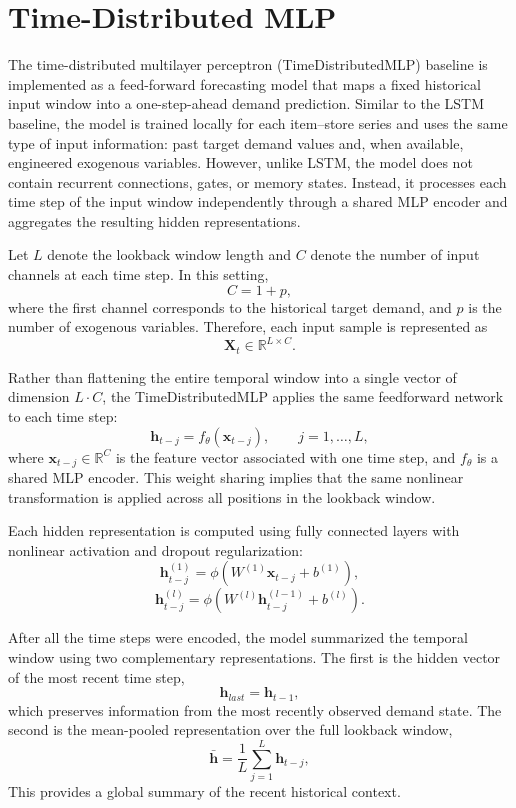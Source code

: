 \section{Time-Distributed MLP}

The time-distributed multilayer perceptron (TimeDistributedMLP) baseline is implemented as a feed-forward forecasting model that maps a fixed historical input window into a one-step-ahead demand prediction. Similar to the LSTM baseline, the model is trained locally for each item--store series and uses the same type of input information: past target demand values and, when available, engineered exogenous variables. However, unlike LSTM, the model does not contain recurrent connections, gates, or memory states. Instead, it processes each time step of the input window independently through a shared MLP encoder and aggregates the resulting hidden representations.

Let \(L\) denote the lookback window length and \(C\) denote the number of input channels at each time step. In this setting,
\[
C = 1 + p,
\]
where the first channel corresponds to the historical target demand, and \(p\) is the number of exogenous variables. Therefore, each input sample is represented as
\[
\mathbf{X}_t \in \mathbb{R}^{L \times C}.
\]

Rather than flattening the entire temporal window into a single vector of dimension \(L \cdot C\), the TimeDistributedMLP applies the same feedforward network to each time step:
\[
\mathbf{h}_{t-j} = f_{\theta}(\mathbf{x}_{t-j}), 
\qquad j = 1,\ldots,L,
\]
where \(\mathbf{x}_{t-j} \in \mathbb{R}^{C}\) is the feature vector associated with one time step, and \(f_{\theta}\) is a shared MLP encoder. This weight sharing implies that the same nonlinear transformation is applied across all positions in the lookback window.

Each hidden representation is computed using fully connected layers with nonlinear activation and dropout regularization:
\[
\mathbf{h}^{(1)}_{t-j} = \phi(W^{(1)}\mathbf{x}_{t-j} + b^{(1)}),
\]
\[
\mathbf{h}^{(l)}_{t-j} = \phi(W^{(l)}\mathbf{h}^{(l-1)}_{t-j} + b^{(l)}).
\]

After all the time steps were encoded, the model summarized the temporal window using two complementary representations. The first is the hidden vector of the most recent time step,
\[
\mathbf{h}_{last} = \mathbf{h}_{t-1},
\]
which preserves information from the most recently observed demand state. The second is the mean-pooled representation over the full lookback window,
\[
\bar{\mathbf{h}} = \frac{1}{L}\sum_{j=1}^{L}\mathbf{h}_{t-j},
\]
This provides a global summary of the recent historical context.

